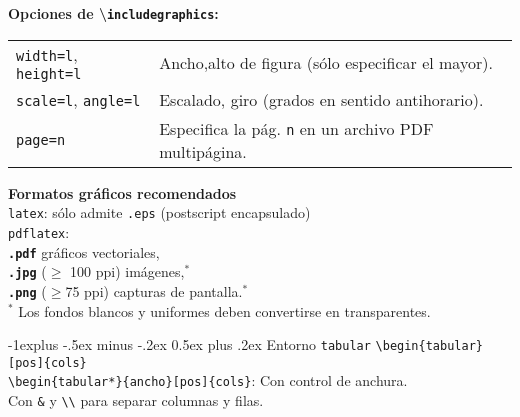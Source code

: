 \documentclass[10pt,landscape,a4paper]{article}
\makeatletter
\renewcommand{\subsection}{\@startsection{subsection}{2}{0mm}%
                                {-1explus -.5ex minus -.2ex}%
                                {0.5ex plus .2ex}%
                                {\normalfont\normalsize\bfseries}}
\makeatother
\begin{document}
\begin{multicols}{3}
\textbf{Opciones de \textbackslash \texttt{includegraphics}:}\\

\begin{tabular}{@{}p{\the\MyLen}%
                @{}p{\linewidth-\the\MyLen}@{}}
\texttt{width=l}, \texttt{height=l}      &  Ancho,alto de figura (sólo especificar el mayor).\\
\texttt{scale=l}, \texttt{angle=l}       &  Escalado, giro (grados en sentido antihorario).\\
\texttt{page=n}       &  Especifica la pág. \texttt{n} en un archivo PDF multipágina.\\[0.7mm]
\end{tabular}


\textbf{Formatos gráficos recomendados}\\
\texttt{latex}: sólo admite \texttt{.eps} (postscript encapsulado)\\
\texttt{pdflatex}:\\
\quad \texttt{\textbf{.pdf}}  gráficos vectoriales,\\
\quad \texttt{\textbf{.jpg}} ($\geq$ 100 ppi)  imágenes,$^*$\\
\quad \texttt{\textbf{.png}} ($\geq$75 ppi)  capturas de pantalla.$^*$\\
$^*$ Los fondos blancos y uniformes deben convertirse en transparentes.




\subsection{Entorno \texttt{tabular} }
\verb!\begin{tabular}[pos]{cols}! \\
\verb!\begin{tabular*}{ancho}[pos]{cols}!: Con control de anchura.\\
Con \texttt{\&} y \verb!\\! para separar columnas y filas.\\[0.7mm]


\end{multicols}
\end{document}
